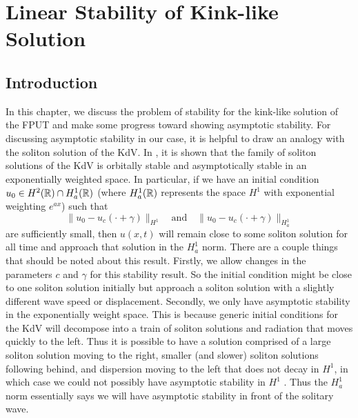 \chapter{Linear Stability of Kink-like Solution}\label{chp:stability}

\section{Introduction}
In this chapter, we discuss the problem of stability for the kink-like solution of the FPUT and make some progress toward showing asymptotic stability. For discussing asymptotic stability in our case, it is helpful to draw an analogy with the soliton solution of the KdV. In \cite{pego1994asymptotic}, it is shown that the family of soliton solutions of the KdV is orbitally stable and asymptotically stable in an exponentially weighted space. In particular, if we have an initial condition \(u_0\in H^2(\mathbb{R})\cap H^1_a(\mathbb{R})\) (where \(H^1_a(\mathbb{R})\) represents the space \(H^1\) with exponential weighting \(e^{ax}\)) such that
\begin{equation}
	\|u_0 - u_c(\cdot + \gamma) \|_{H^1} \quad \text{and} \quad \|u_0 - u_c(\cdot + \gamma) \|_{H^1_a}
\end{equation}
are sufficiently small, then \(u(x,t)\) will remain close to some soliton solution for all time and approach that solution in the \(H^1_a\) norm. There are a couple things that should be noted about this result. Firstly, we allow changes in the parameters \(c\) and \(\gamma\) for this stability result. So the initial condition might be close to one soliton solution initially but approach a soliton solution with a slightly different wave speed or displacement. Secondly, we only have asymptotic stability in the exponentially weight space. This is because generic initial conditions for the KdV will decompose into a train of soliton solutions and radiation that moves quickly to the left. Thus it is possible to have a solution comprised of a large soliton solution moving to the right, smaller (and slower) soliton solutions following behind, and dispersion moving to the left that does not decay in \(H^1\), in which case we could not possibly have asymptotic stability in \(H^1\) \cite{schuur2006asymptotic}. Thus the \(H^1_a\) norm essentially says we will have asymptotic stability in front of the solitary wave.

